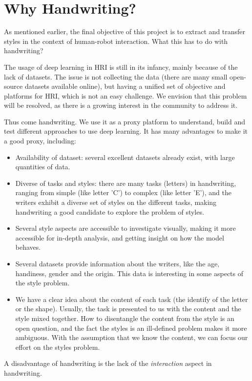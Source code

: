 \section{Why Handwriting?}
  \par As mentioned earlier, the final objective of this project is to extract and transfer styles in the context of human-robot interaction. What this has to do with handwriting?
  \par The usage of deep learning in HRI is still in its infancy, mainly because of the lack of datasets. The issue is not collecting the data (there are many small open-source datasets available online), but having a unified set of objective and platforms for HRI, which is not an easy challenge. We envision that this problem will be resolved, as there is a growing interest in the community to address it.

  \par Thus come handwriting. We use it as a proxy platform to understand, build and test different approaches to use deep learning. It has many advantages to make it a good proxy, including:
    \begin{itemize}
    \item Availability of dataset: several excellent datasets already exist, with large quantities of data.
    \item Diverse of tasks and styles: there are many tasks (letters) in handwriting, ranging from simple (like letter 'C') to complex (like letter 'E'), and the writers exhibit a diverse set of styles on the different tasks, making handwriting a good candidate to explore the problem of styles.
    \item Several style aspects are accessible to investigate visually, making it more accessible for in-depth analysis, and getting insight on how the model behaves.
    \item Several datasets provide information about the writers, like the age, handiness, gender and the origin. This data is interesting in some aspects of the style problem.
    \item We have a clear idea about the content of each task (the identify of the letter or the shape). Usually, the task is presented to us with the content and the style mixed together. How to disentangle the content from the style is an open question, and the fact the styles is an ill-defined problem makes it more ambiguous. With the assumption that we know the content, we can focus our effort on the styles problem.
    \end{itemize}
  A disadvantage of handwriting is the lack of the \textit{interaction} aspect in handwriting.

